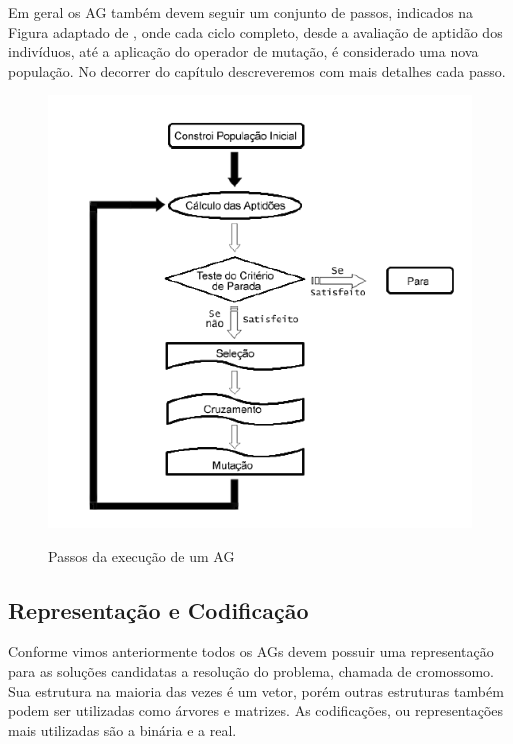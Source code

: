 	

Em geral os AG também devem seguir um conjunto de passos, indicados na Figura adaptado de \cite{kondageski08}, onde cada ciclo completo, desde a avaliação de aptidão dos indivíduos, até a aplicação do operador de mutação, é considerado uma nova população. No decorrer do capítulo descreveremos com mais detalhes cada passo.

\begin{figure}[ht!]
	\centering
	\includegraphics[scale=0.8]{figuras/processo-evolutivo.PNG}
	\label{processo-evolutivo}
	\caption{Passos da execução de um AG}
\end{figure}

\subsection{Representação e Codificação}
 
 
Conforme vimos anteriormente todos os AGs devem possuir uma representação para as soluções candidatas a resolução do problema, chamada de cromossomo. Sua estrutura na maioria das vezes é um vetor, porém outras estruturas também podem ser utilizadas como árvores e matrizes. As codificações, ou representações mais utilizadas são a binária e a real.



